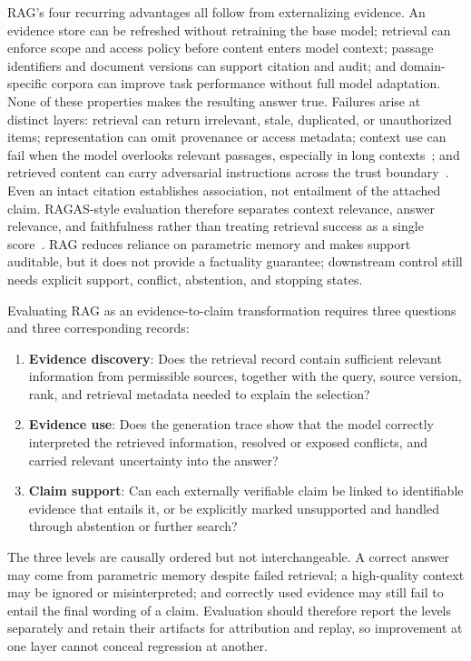 RAG's four recurring advantages all follow from externalizing evidence. An evidence store can be refreshed without retraining the base model; retrieval can enforce scope and access policy before content enters model context; passage identifiers and document versions can support citation and audit; and domain-specific corpora can improve task performance without full model adaptation. None of these properties makes the resulting answer true. Failures arise at distinct layers: retrieval can return irrelevant, stale, duplicated, or unauthorized items; representation can omit provenance or access metadata; context use can fail when the model overlooks relevant passages, especially in long contexts~\cite{liu2024lostinthemiddle}; and retrieved content can carry adversarial instructions across the trust boundary~\cite{greshake2023promptinjection}. Even an intact citation establishes association, not entailment of the attached claim. RAGAS-style evaluation therefore separates context relevance, answer relevance, and faithfulness rather than treating retrieval success as a single score~\cite{es2024ragas}. RAG reduces reliance on parametric memory and makes support auditable, but it does not provide a factuality guarantee; downstream control still needs explicit support, conflict, abstention, and stopping states.

Evaluating RAG as an evidence-to-claim transformation requires three questions and three corresponding records:
\begin{enumerate}
    \item \textbf{Evidence discovery}: Does the retrieval record contain sufficient relevant information from permissible sources, together with the query, source version, rank, and retrieval metadata needed to explain the selection?
    \item \textbf{Evidence use}: Does the generation trace show that the model correctly interpreted the retrieved information, resolved or exposed conflicts, and carried relevant uncertainty into the answer?
    \item \textbf{Claim support}: Can each externally verifiable claim be linked to identifiable evidence that entails it, or be explicitly marked unsupported and handled through abstention or further search?
\end{enumerate}
The three levels are causally ordered but not interchangeable. A correct answer may come from parametric memory despite failed retrieval; a high-quality context may be ignored or misinterpreted; and correctly used evidence may still fail to entail the final wording of a claim. Evaluation should therefore report the levels separately and retain their artifacts for attribution and replay, so improvement at one layer cannot conceal regression at another.

